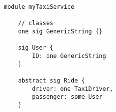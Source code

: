 \documentclass{article}
\begin{document}
    \begin{lstlisting}[language=alloy]
module myTaxiService

    // classes
    one sig GenericString {}

    sig User {
        ID: one GenericString
    }

    abstract sig Ride {
        driver: one TaxiDriver,
        passenger: some User
    }
    \end{lstlisting}
\end{document}
